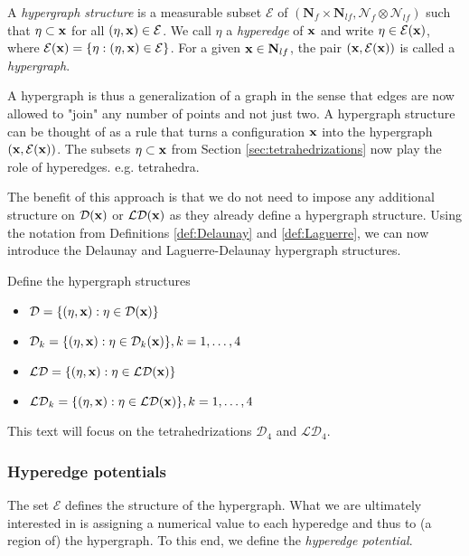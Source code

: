 \begin{definition}
	A \textit{hypergraph structure} is a measurable subset $\mathcal E$ of $(\mathbf N_f\times \mathbf N_{lf}, \mathcal N_f \otimes \mathcal N_{lf})$ such that $\eta \subset {\mathbf{x}}$ for all $(\eta,{\mathbf{x}})\in\mathcal E$. We call $\eta$ a \textit{hyperedge} of ${\mathbf{x}}$ and write $\eta \in \mathcal E({\mathbf{x}})$, where $\mathcal E({\mathbf{x}}) = \{\eta: (\eta,{\mathbf{x}}) \in \mathcal E\}$. For a given ${\mathbf{x}} \in \mathbf N_{lf}$, the pair $({\mathbf{x}}, \mathcal E({\mathbf{x}}))$ is called a \textit{hypergraph}.
\end{definition}
A hypergraph is thus a generalization of a graph in the sense that edges are now allowed to "join" any number of points and not just two. A hypergraph structure can be thought of as a rule that turns a configuration ${\mathbf{x}}$ into the hypergraph $({\mathbf{x}},\mathcal E({\mathbf{x}}))$. 
The subsets $\eta \subset {\mathbf{x}}$ from Section \ref{sec:tetrahedrizations} now play the role of hyperedges. e.g. tetrahedra.

The benefit of this approach is that we do not need to impose any additional structure on $\mathcal D({\mathbf{x}})$ or $\mathcal {LD}({\mathbf{x}})$ as they already define a hypergraph structure. Using the notation from Definitions \ref{def:Delaunay} and \ref{def:Laguerre}, we can now introduce the Delaunay and Laguerre-Delaunay hypergraph structures. 

\begin{definition}
	Define the hypergraph structures
	\begin{itemize}
		\item $\mathcal D = \{(\eta,{\mathbf{x}}): \eta \in \mathcal D({\mathbf{x}})\}$
		\item 	$\mathcal D_k = \{(\eta,{\mathbf{x}}): \eta \in \mathcal D_k({\mathbf{x}})\}, k=1,\dots,4$
		\item 	$\mathcal {LD} = \{(\eta,{\mathbf{x}}): \eta \in \mathcal {LD}({\mathbf{x}})\}$
		\item 	$\mathcal {LD}_k = \{(\eta,{\mathbf{x}}): \eta \in \mathcal {LD}({\mathbf{x}})\}, k=1,\dots,4$
	\end{itemize}
\end{definition}

This text will focus on the tetrahedrizations $\mathcal {D}_4$ and $\mathcal {LD}_4$.

\subsubsection{Hyperedge potentials}
The set $\mathcal E$ defines the structure of the hypergraph. What we are ultimately interested in is assigning a numerical value to each hyperedge and thus to (a region of) the hypergraph. To this end, we define the \textit{hyperedge potential}.

